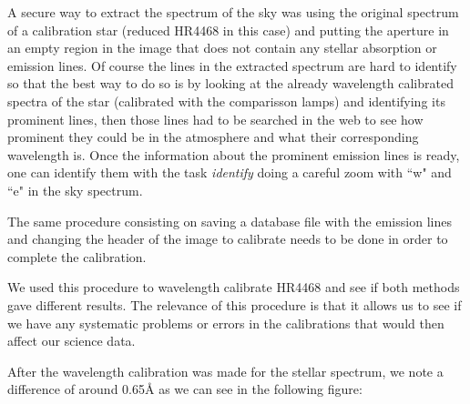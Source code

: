 A secure way to extract the spectrum of the sky was using the original spectrum of a calibration star (reduced HR4468 in this case) and putting the aperture in an empty region in the image that does not contain any stellar absorption or emission lines. Of course the lines in the extracted spectrum are hard to identify so that the best way to do so is by looking at the already wavelength calibrated spectra of the star (calibrated with the comparisson lamps) and identifying its prominent lines, then those lines had to be searched in the web to see how prominent they could be in the atmosphere and what their corresponding wavelength is. Once the information about the prominent emission lines is ready, one can identify them with the task \textit{identify} doing a careful zoom with ``w" and ``e"  in the sky spectrum. 

The same procedure consisting on saving a database file with the emission lines and changing the header of the image to calibrate needs to be done in order to complete the calibration.

We used this procedure to wavelength calibrate HR4468 and see if both methods gave different results. The relevance of this procedure is that it allows us to see if we have any systematic problems or errors in the calibrations that would then affect our science data.

After the wavelength calibration was made for the stellar spectrum, we note a difference of around 0.65$\textrm{\AA}$ as we can see in the following figure:

